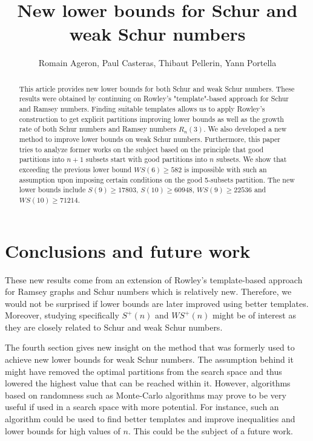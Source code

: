 \documentclass{article}
\title{New lower bounds for Schur and weak Schur numbers}
\author{Romain Ageron, Paul Casteras, Thibaut Pellerin, Yann Portella}
\newtheorem{computational theorem}{Computational Theorem}[section]
\newcommand{\WS}{\mathit{WS}}
\begin{document}
\maketitle

\begin{abstract}

This article provides new lower bounds for both Schur and weak Schur numbers. These results were obtained by continuing on
Rowley's "template"-based approach for Schur and Ramsey numbers. Finding suitable templates allows us to apply Rowley's construction
to get explicit partitions improving lower bounds as well as the growth rate of both Schur numbers and Ramsey numbers \(R_n(3)\).
We also developed a new method to improve lower bounds on weak Schur numbers. Furthermore, this paper tries to analyze former
works on the subject based on the principle that good partitions into \(n+1\) subsets start with good partitions
into \(n\) subsets. We show that exceeding the previous lower bound \(\WS (6) \geqslant 582\) is impossible with such an assumption upon
imposing certain conditions on the good 5-subsets partition. The new lower bounds include \(S(9) \geqslant 17803\), \(S(10) \geqslant 60948\),
\(\WS (9) \geqslant 22536 \) and \(\WS (10) \geqslant 71214 \).

\end{abstract}















\section{Conclusions and future work}

\par
These new results come from an extension of Rowley's template-based approach for Ramsey graphs and Schur numbers which is relatively new.
Therefore, we would not be surprised if lower bounds are later improved using better templates. Moreover, studying specifically \(S^+(n)\) and
\(\WS^+(n)\) might be of interest as they are closely related to Schur and weak Schur numbers.

\par
The fourth section gives new insight on the method that was formerly used to achieve new lower bounds for weak Schur numbers. The assumption behind it
might have removed the optimal partitions from the search space and thus lowered the highest value that can be reached within it.
However, algorithms based on randomness such as Monte-Carlo algorithms may prove to be very useful if used in a search space with more
potential. For instance, such an algorithm could be used to find better templates and improve inequalities and lower bounds for high values
of \(n\). This could be the subject of a future work.
\end{document}
